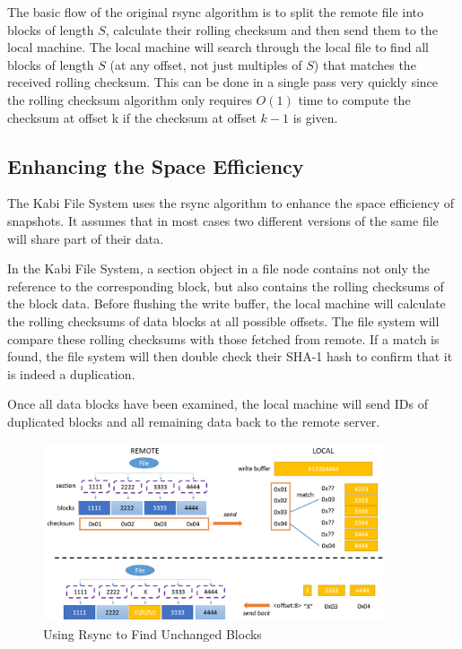     The basic flow of the original rsync algorithm is to split the remote file into blocks of length $S$, calculate their rolling checksum and then send them to the local machine. The local machine will search through the local file to find all blocks of length $S$ (at any offset, not just multiples of $S$) that matches the received rolling checksum. This can be done in a single pass very quickly since the rolling checksum algorithm only requires $O(1)$ time to compute the checksum at offset k if the checksum at offset $k-1$ is given.

\subsection{Enhancing the Space Efficiency}

    The Kabi File System uses the rsync algorithm to enhance the space efficiency of snapshots. It assumes that in most cases two different versions of the same file will share part of their data.

    In the Kabi File System, a section object in a file node contains not only the reference to the corresponding block, but also contains the rolling checksums of the block data. Before flushing the write buffer, the local machine will calculate the rolling checksums of data blocks at all possible offsets. The file system will compare these rolling checksums with those fetched from remote. If a match is found, the file system will then double check their SHA-1 hash to confirm that it is indeed a duplication.
    
    Once all data blocks have been examined, the local machine will send IDs of duplicated blocks and all remaining data back to the remote server.


\begin{figure}[t]
\centering
\includegraphics[width=0.9\textwidth]{Chapter-4/figs/fig25.png}
\caption{Using Rsync to Find Unchanged Blocks}
\label{fig:rsync}
\end{figure}

